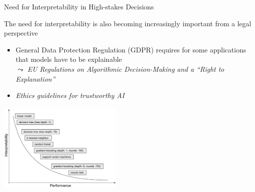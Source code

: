 \documentclass[11pt,compress,t,notes=noshow, aspectratio=169, xcolor=table]{beamer}
\begin{document}
\begin{frame}{Need for Interpretability in High-stakes Decisions}

    The need for interpretability is also becoming increasingly important from a legal perspective
    
    \begin{itemize}
    \item General Data Protection Regulation (GDPR) requires for some applications that models have to be explainable \\
    $\leadsto$ \textit{EU Regulations on Algorithmic Decision-Making and a ``Right to Explanation''} 
    
    \item \textit{Ethics guidelines for trustworthy AI}

    \end{itemize}
    \medskip
    
    \centering\includegraphics[width=0.45\textwidth]{figure/performance_vs_interpretability.png}
\end{frame}


\end{document}
